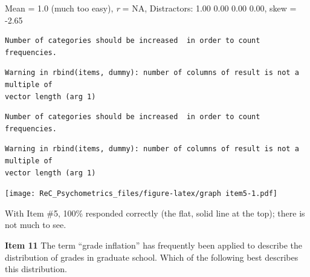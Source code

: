 \documentclass[
  english,
]{book}
\newenvironment{Shaded}{\begin{snugshade}}{\end{snugshade}}
\newcommand{\AttributeTok}[1]{\textcolor[rgb]{0.77,0.63,0.00}{#1}}
\newcommand{\CommentTok}[1]{\textcolor[rgb]{0.56,0.35,0.01}{\textit{#1}}}
\newcommand{\DecValTok}[1]{\textcolor[rgb]{0.00,0.00,0.81}{#1}}
\newcommand{\FunctionTok}[1]{\textcolor[rgb]{0.00,0.00,0.00}{#1}}
\newcommand{\NormalTok}[1]{#1}
\newcommand{\SpecialCharTok}[1]{\textcolor[rgb]{0.00,0.00,0.00}{#1}}
\begin{document}
Mean = 1.0 (much too easy), \emph{r} = NA, Distractors: 1.00 0.00 0.00 0.00, skew = -2.65

\begin{Shaded}
\end{Shaded}

\begin{verbatim}
Number of categories should be increased  in order to count frequencies. 
\end{verbatim}

\begin{verbatim}
Warning in rbind(items, dummy): number of columns of result is not a multiple of
vector length (arg 1)
\end{verbatim}

\begin{verbatim}
Number of categories should be increased  in order to count frequencies. 
\end{verbatim}

\begin{verbatim}
Warning in rbind(items, dummy): number of columns of result is not a multiple of
vector length (arg 1)
\end{verbatim}

\texttt{[image: ReC\_Psychometrics\_files/figure-latex/graph item5-1.pdf]}

With Item \#5, 100\% responded correctly (the flat, solid line at the top); there is not much to see.

\textbf{Item 11} The term ``grade inflation'' has frequently been applied to describe the distribution of grades in graduate school. Which of the following best describes this distribution.
\end{document}
